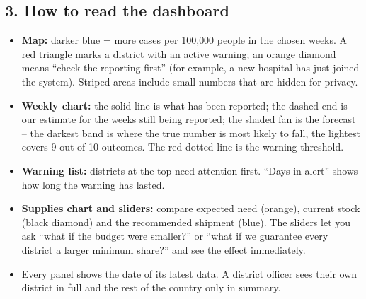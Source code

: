 \subsection*{3. How to read the dashboard}
\begin{itemize}
\item \textbf{Map:} darker blue = more cases per 100{,}000 people in the chosen weeks. A red triangle marks a
district with an active warning; an orange diamond means ``check the reporting first'' (for example, a new
hospital has just joined the system). Striped areas include small numbers that are hidden for privacy.
\item \textbf{Weekly chart:} the solid line is what has been reported; the dashed end is our estimate for the
weeks still being reported; the shaded fan is the forecast -- the darkest band is where the true number is
most likely to fall, the lightest covers 9 out of 10 outcomes. The red dotted line is the warning threshold.
\item \textbf{Warning list:} districts at the top need attention first. ``Days in alert'' shows how long the
warning has lasted.
\item \textbf{Supplies chart and sliders:} compare expected need (orange), current stock (black diamond) and the
recommended shipment (blue). The sliders let you ask ``what if the budget were smaller?'' or ``what if we
guarantee every district a larger minimum share?'' and see the effect immediately.
\item Every panel shows the date of its latest data. A district officer sees their own district in full and the
rest of the country only in summary.
\end{itemize}

